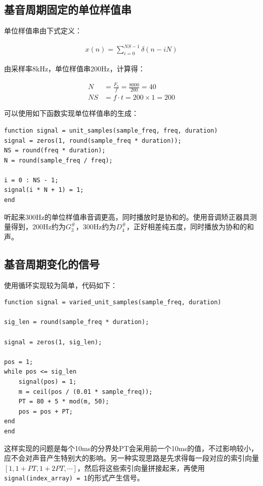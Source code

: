 \documentclass[10pt, a4paper]{article}
\begin{document}
\subsection{基音周期固定的单位样值串}\label{sec:pitch_period_fixed}

单位样值串由下式定义：

\begin{align*}
    x(n) = \sum_{i = 0}^{NS - 1} \delta(n - iN)
\end{align*}

由采样率8kHz，单位样值串200Hz，计算得：

\begin{align*}
    N  & = \frac{F_s}{f} = \frac{8000}{200} = 40 \\
    NS & = f \cdot t = 200 \times 1 = 200
\end{align*}

可以使用如下函数实现单位样值串的生成：

\begin{verbatim}
function signal = unit_samples(sample_freq, freq, duration)
signal = zeros(1, round(sample_freq * duration));
NS = round(freq * duration);
N = round(sample_freq / freq);

i = 0 : NS - 1;
signal(i * N + 1) = 1;
end
\end{verbatim}

听起来300Hz的单位样值串音调更高，同时播放时是协和的。使用音调矫正器具测量得到，200Hz约为$G_3^\#$，300Hz约为$D_4^\#$，正好相差纯五度，同时播放为协和的和声。


\subsection{基音周期变化的信号}\label{sec:pitch_period_change}

使用循环实现较为简单，代码如下：

\begin{verbatim}
function signal = varied_unit_samples(sample_freq, duration)

sig_len = round(sample_freq * duration);

signal = zeros(1, sig_len);

pos = 1;
while pos <= sig_len
    signal(pos) = 1;
    m = ceil(pos / (0.01 * sample_freq));
    PT = 80 + 5 * mod(m, 50);
    pos = pos + PT;
end
end
\end{verbatim}

这样实现的问题是每个10ms的分界处PT会采用前一个10ms的值，不过影响较小，应不会对声音产生特别大的影响。另一种实现思路是先求得每一段对应的索引向量$[1, 1+PT, 1+2PT, \cdots]$，然后将这些索引向量拼接起来，再使用\texttt{signal(index_array) = 1}的形式产生信号。
\end{document}
